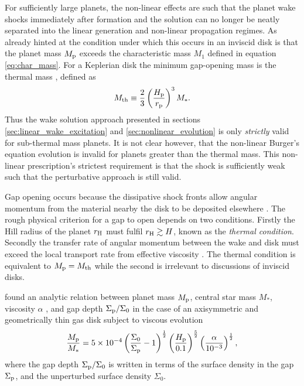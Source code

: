 For sufficiently large planets, the non-linear effects are such that the planet wake shocks immediately after formation and the solution can no longer be neatly separated into the linear generation and non-linear propagation regimes.
As already hinted at the condition under which this occurs in an inviscid disk is that the planet mass $M_{\rm p}$ exceeds the characteristic mass $M_1$ defined in equation \ref{eq:char_mass}.
For a Keplerian disk the minimum gap-opening mass is the thermal mass \citep{lin1993}, defined as \citep{goodman2001}
\begin{align}
    M_{\rm th} \equiv \frac{2}{3} \left( \frac{H_{\rm p}}{r_{\rm p}}  \right)^3 M_*. \label{eq:thermalmass}
\end{align}
Thus the wake solution approach presented in sections \ref{sec:linear_wake_excitation} and \ref{sec:nonlinear_evolution} is only \textit{strictly} valid for sub-thermal mass planets. It is not clear however, that the non-linear Burger's equation evolution is invalid for planets greater than the thermal mass. This non-linear prescription's strictest requirement is that the shock is sufficiently weak such that the perturbative approach is still valid.

Gap opening occurs because the dissipative shock fronts allow angular momentum from the material nearby the disk to be deposited elsewhere \citep{lin1979,goldreich1979,goldreich1980}.
The rough physical criterion for a gap to open depends on two conditions.
Firstly the Hill radius of the planet $r_{\rm H}$ \citep{hill1878} must fulfil $r_{\rm H} \gtrsim H$, known as the \textit{thermal condition}.
Secondly the transfer rate of angular momentum between the wake and disk must exceed the local transport rate from effective viscosity \citep{lin1993}.
The thermal condition is equivalent to $M_{\rm p} = M_{\rm th}$ while the second is irrelevant to discussions of inviscid disks.

\citet{kanagawa2015} found an analytic relation between planet mass $M_{\rm p}$, central star mass $M_*$, viscosity $\alpha$ \citep{shakura1973}, and gap depth $\Sigma_{\rm p} / \Sigma_0$ in the case of an axisymmetric and geometrically thin gas disk subject to viscous evolution
\begin{align}
    \frac{M_{\rm p}}{M_*} = 5 \times 10^{-4} \left( \frac{\Sigma_0}{\Sigma_{\rm p}} - 1 \right)^{\frac{1}{2}} \left( \frac{H_{\rm p}}{0.1}  \right)^{\frac{5}{2}} \left( \frac{\alpha}{10^{-3}} \right)^{\frac{1}{2}},
\end{align}
where the gap depth $\Sigma_{\rm p} / \Sigma_0$ is written in terms of the surface density in the gap $\Sigma_{\rm p}$, and the unperturbed surface density $\Sigma_0$.

